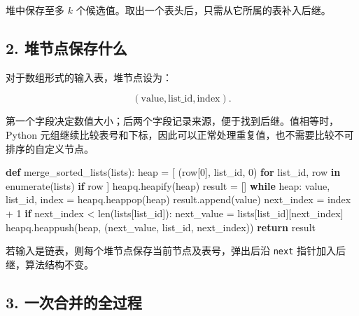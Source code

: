 \documentclass[
  UTF8,fontset=none,zihao=5]{ctexart}
\newenvironment{Shaded}{}{}
\newcommand{\BuiltInTok}[1]{#1}
\newcommand{\ControlFlowTok}[1]{\textcolor[rgb]{0.00,0.44,0.13}{\textbf{#1}}}
\newcommand{\DecValTok}[1]{\textcolor[rgb]{0.25,0.63,0.44}{#1}}
\newcommand{\KeywordTok}[1]{\textcolor[rgb]{0.00,0.44,0.13}{\textbf{#1}}}
\newcommand{\NormalTok}[1]{#1}
\newcommand{\OperatorTok}[1]{\textcolor[rgb]{0.40,0.40,0.40}{#1}}
\renewenvironment{Shaded}{\begin{snugshade}}{\end{snugshade}}
\let\OldSubsection\subsection
\renewcommand{\subsection}{\Needspace{4\baselineskip}\OldSubsection}
\begin{document}
堆中保存至多 \(k\) 个候选值。取出一个表头后，只需从它所属的表补入后继。

\hypertarget{ux5806ux8282ux70b9ux4fddux5b58ux4ec0ux4e48}{%
\subsection{2.
堆节点保存什么}\label{ux5806ux8282ux70b9ux4fddux5b58ux4ec0ux4e48}}

对于数组形式的输入表，堆节点设为：

\[
(\text{value},\text{list\_id},\text{index}).
\]

第一个字段决定数值大小；后两个字段记录来源，便于找到后继。值相等时，Python
元组继续比较表号和下标，因此可以正常处理重复值，也不需要比较不可排序的自定义节点。

\Needspace{176pt}

\begin{Shaded}
\begin{Highlighting}[]
\KeywordTok{def}\NormalTok{ merge\_sorted\_lists(lists):}
\NormalTok{    heap }\OperatorTok{=}\NormalTok{ [}
\NormalTok{        (row[}\DecValTok{0}\NormalTok{], list\_id, }\DecValTok{0}\NormalTok{)}
        \ControlFlowTok{for}\NormalTok{ list\_id, row }\KeywordTok{in} \BuiltInTok{enumerate}\NormalTok{(lists)}
        \ControlFlowTok{if}\NormalTok{ row}
\NormalTok{    ]}
\NormalTok{    heapq.heapify(heap)}
\NormalTok{    result }\OperatorTok{=}\NormalTok{ []}
    \ControlFlowTok{while}\NormalTok{ heap:}
\NormalTok{        value, list\_id, index }\OperatorTok{=}\NormalTok{ heapq.heappop(heap)}
\NormalTok{        result.append(value)}
\NormalTok{        next\_index }\OperatorTok{=}\NormalTok{ index }\OperatorTok{+} \DecValTok{1}
        \ControlFlowTok{if}\NormalTok{ next\_index }\OperatorTok{\textless{}} \BuiltInTok{len}\NormalTok{(lists[list\_id]):}
\NormalTok{            next\_value }\OperatorTok{=}\NormalTok{ lists[list\_id][next\_index]}
\NormalTok{            heapq.heappush(heap, (next\_value, list\_id, next\_index))}
    \ControlFlowTok{return}\NormalTok{ result}
\end{Highlighting}
\end{Shaded}

若输入是链表，则每个堆节点保存当前节点及表号，弹出后沿 \texttt{next}
指针加入后继，算法结构不变。

\hypertarget{ux4e00ux6b21ux5408ux5e76ux7684ux5168ux8fc7ux7a0b}{%
\subsection{3.
一次合并的全过程}\label{ux4e00ux6b21ux5408ux5e76ux7684ux5168ux8fc7ux7a0b}}
\end{document}
